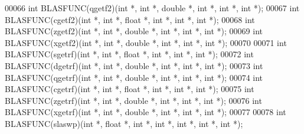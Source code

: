 \begin{DoxyCode}
00066 \textcolor{keywordtype}{int} BLASFUNC(qgetf2)(\textcolor{keywordtype}{int} *, \textcolor{keywordtype}{int} *, \textcolor{keywordtype}{double} *, \textcolor{keywordtype}{int} *, \textcolor{keywordtype}{int} *, \textcolor{keywordtype}{int} *);
00067 \textcolor{keywordtype}{int} BLASFUNC(cgetf2)(\textcolor{keywordtype}{int} *, \textcolor{keywordtype}{int} *, \textcolor{keywordtype}{float}  *, \textcolor{keywordtype}{int} *, \textcolor{keywordtype}{int} *, \textcolor{keywordtype}{int} *);
00068 \textcolor{keywordtype}{int} BLASFUNC(zgetf2)(\textcolor{keywordtype}{int} *, \textcolor{keywordtype}{int} *, \textcolor{keywordtype}{double} *, \textcolor{keywordtype}{int} *, \textcolor{keywordtype}{int} *, \textcolor{keywordtype}{int} *);
00069 \textcolor{keywordtype}{int} BLASFUNC(xgetf2)(\textcolor{keywordtype}{int} *, \textcolor{keywordtype}{int} *, \textcolor{keywordtype}{double} *, \textcolor{keywordtype}{int} *, \textcolor{keywordtype}{int} *, \textcolor{keywordtype}{int} *);
00070 
00071 \textcolor{keywordtype}{int} BLASFUNC(sgetrf)(\textcolor{keywordtype}{int} *, \textcolor{keywordtype}{int} *, \textcolor{keywordtype}{float}  *, \textcolor{keywordtype}{int} *, \textcolor{keywordtype}{int} *, \textcolor{keywordtype}{int} *);
00072 \textcolor{keywordtype}{int} BLASFUNC(dgetrf)(\textcolor{keywordtype}{int} *, \textcolor{keywordtype}{int} *, \textcolor{keywordtype}{double} *, \textcolor{keywordtype}{int} *, \textcolor{keywordtype}{int} *, \textcolor{keywordtype}{int} *);
00073 \textcolor{keywordtype}{int} BLASFUNC(qgetrf)(\textcolor{keywordtype}{int} *, \textcolor{keywordtype}{int} *, \textcolor{keywordtype}{double} *, \textcolor{keywordtype}{int} *, \textcolor{keywordtype}{int} *, \textcolor{keywordtype}{int} *);
00074 \textcolor{keywordtype}{int} BLASFUNC(cgetrf)(\textcolor{keywordtype}{int} *, \textcolor{keywordtype}{int} *, \textcolor{keywordtype}{float}  *, \textcolor{keywordtype}{int} *, \textcolor{keywordtype}{int} *, \textcolor{keywordtype}{int} *);
00075 \textcolor{keywordtype}{int} BLASFUNC(zgetrf)(\textcolor{keywordtype}{int} *, \textcolor{keywordtype}{int} *, \textcolor{keywordtype}{double} *, \textcolor{keywordtype}{int} *, \textcolor{keywordtype}{int} *, \textcolor{keywordtype}{int} *);
00076 \textcolor{keywordtype}{int} BLASFUNC(xgetrf)(\textcolor{keywordtype}{int} *, \textcolor{keywordtype}{int} *, \textcolor{keywordtype}{double} *, \textcolor{keywordtype}{int} *, \textcolor{keywordtype}{int} *, \textcolor{keywordtype}{int} *);
00077 
00078 \textcolor{keywordtype}{int} BLASFUNC(slaswp)(\textcolor{keywordtype}{int} *, \textcolor{keywordtype}{float}  *, \textcolor{keywordtype}{int} *, \textcolor{keywordtype}{int} *, \textcolor{keywordtype}{int} *, \textcolor{keywordtype}{int} *, \textcolor{keywordtype}{int} *);

\end{DoxyCode}
